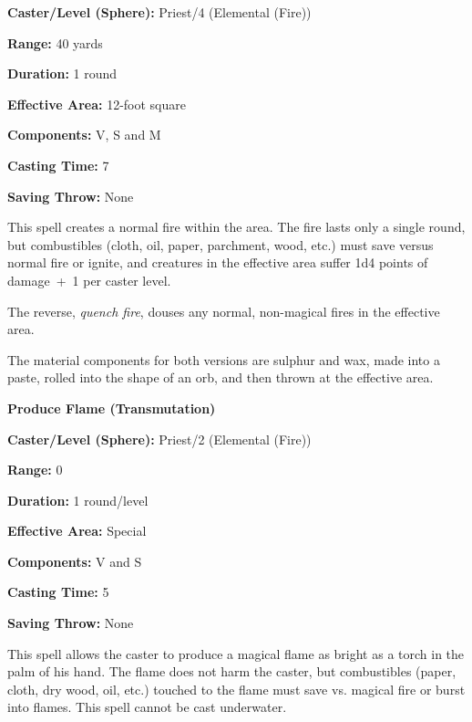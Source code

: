 \begin{multicols}{2}
\begin{minipage}{\columnwidth}
\noindent \textbf{Caster/Level (Sphere):} Priest/4 (Elemental (Fire))

\noindent \textbf{Range:} 40 yards

\noindent \textbf{Duration:} 1 round

\noindent \textbf{Effective Area:} 12-foot square

\noindent \textbf{Components:} V, S and M

\noindent \textbf{Casting Time:} 7

\noindent \textbf{Saving Throw:} None

\end{minipage}

This spell creates a normal fire within the area.  The fire lasts only a single round, but combustibles (cloth, oil, paper, parchment, wood, etc.) must save versus normal fire or ignite, and creatures in the effective area suffer 1d4 points of damage~+~1 per caster level.  

The reverse, \textit{quench fire}, douses any normal, non-magical fires in the effective area.

The material components for both versions are sulphur and wax, made into a paste, rolled into the shape of an orb, and then thrown at the effective area.

 
\vspace{1em}

\noindent
\begin{minipage}{\columnwidth}

\noindent \textbf{Produce Flame (Transmutation)}

\noindent \textbf{Caster/Level (Sphere):} Priest/2 (Elemental (Fire))

\noindent \textbf{Range:} 0

\noindent \textbf{Duration:} 1 round/level

\noindent \textbf{Effective Area:} Special

\noindent \textbf{Components:} V and S

\noindent \textbf{Casting Time:} 5

\noindent \textbf{Saving Throw:} None

\end{minipage}

This spell allows the caster to produce a magical flame as bright as a torch in the palm of his hand.  The flame does not harm the caster, but combustibles (paper, cloth, dry wood, oil, etc.) touched to the flame must save vs. magical fire or burst into flames.  This spell cannot be cast underwater.


\end{multicols}
